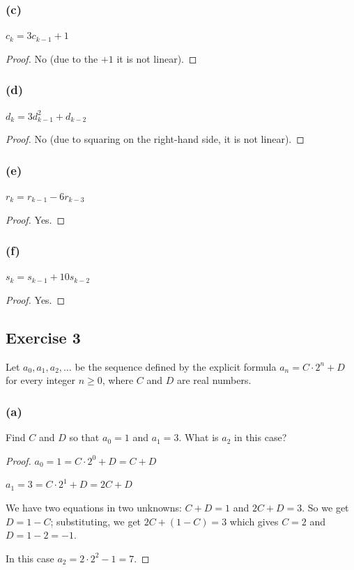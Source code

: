 \documentclass[14pt]{extarticle}
\begin{document}
\subsubsection{(c)}
\(c_k = 3c_{k-1} + 1\)

\begin{proof}
No (due to the $+ 1$ it is not linear).
\end{proof}

\subsubsection{(d)}
\(d_k = 3d^2_{k-1} + d_{k-2}\)

\begin{proof}
No (due to squaring on the right-hand side, it is not linear).
\end{proof}

\subsubsection{(e)}
\(r_k = r_{k-1} - 6r_{k-3}\)

\begin{proof}
Yes.
\end{proof}

\subsubsection{(f)}
\(s_k = s_{k-1} + 10s_{k-2}\)

\begin{proof}
Yes.
\end{proof}

\subsection{Exercise 3}
Let \(a_0, a_1, a_2, \ldots\) be the sequence defined by the explicit formula \(a_n = C \cdot 2^n + D\) for every 
integer \(n \geq 0\), where $C$ and $D$ are real numbers.

\subsubsection{(a)}
Find $C$ and $D$ so that \(a_0 = 1\) and \(a_1 = 3\). What is $a_2$ in this case?

\begin{proof}
\(a_0 = 1 = C \cdot 2^0 + D = C + D\)

\(a_1 = 3 = C \cdot 2^1 + D = 2C + D\)

We have two equations in two unknowns: \(C+D = 1\) and \(2C+D = 3\). So we get $D = 1-C$; substituting, we get
\(2C + (1-C) = 3\) which gives $C = 2$ and $D = 1-2 = -1$.

In this case \(a_2 = 2 \cdot 2^2 - 1 = 7\).
\end{proof}
\end{document}
